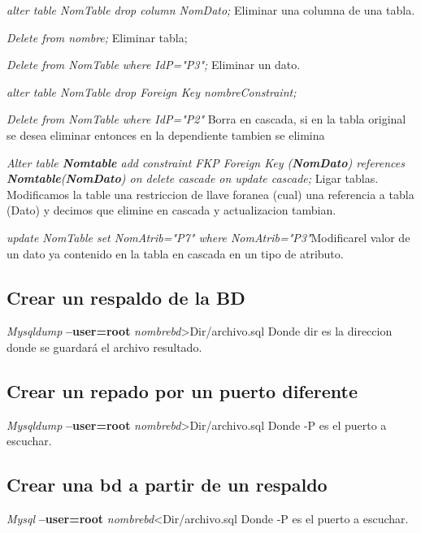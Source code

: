 \documentclass[12pt, fleqn]{report}                             %
\theoremstyle{break}                                            %
\begin{document}
	\emph{alter table NomTable drop column NomDato;} Eliminar una columna de una tabla.

	\emph{Delete from nombre;} Eliminar tabla;


	\emph{Delete from NomTable where IdP="P3";} Eliminar un dato.


	\emph{alter table NomTable drop Foreign Key nombreConstraint;}

	\emph{Delete from NomTable where IdP="P2"} Borra en cascada, si en la tabla original se desea eliminar entonces en la dependiente tambien se elimina


	\emph{Alter table \textbf{Nomtable} add constraint FKP Foreign Key (\textbf{NomDato}) references \textbf{Nomtable}(\textbf{NomDato}) on delete cascade on update cascade;} Ligar tablas. Modificamos la table una restriccion de llave foranea (cual) una referencia a tabla (Dato) y decimos que elimine en cascada y actualizacion tambian.

	\emph{update NomTable set NomAtrib="P7" where NomAtrib="P3"}Modificarel valor de un dato ya contenido en la tabla en cascada en un tipo de atributo.

    \subsection{Crear un respaldo de la BD}
    \emph{Mysqldump } \textbf{--user=root}  \emph{nombrebd}>Dir/archivo.sql
    Donde dir es la direccion donde se guardará el archivo resultado.

    \subsection{Crear un repado por un puerto diferente}
    \emph{Mysqldump } \textbf{--user=root}  \emph{nombrebd}>Dir/archivo.sql
    Donde -P es el puerto a escuchar.
    \subsection{Crear una bd a partir de un respaldo}
    \emph{Mysql} \textbf{--user=root}  \emph{nombrebd}<Dir/archivo.sql
    Donde -P es el puerto a escuchar.


	\begin{appendices}
	
	
	\end{appendices}
	
    
	
\end{document}
